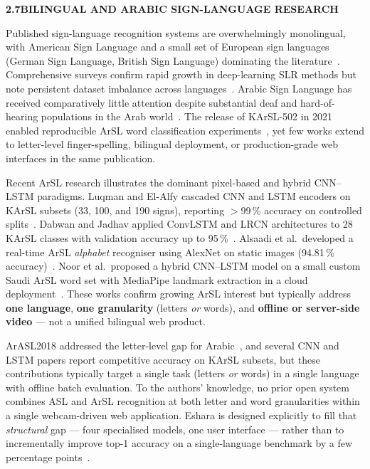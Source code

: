 \noindent\textbf{2.7\quad BILINGUAL AND ARABIC SIGN-LANGUAGE RESEARCH}\par
{}
\vspace{0.2cm}

\noindent Published sign-language recognition systems are overwhelmingly monolingual, with American Sign Language and a small set of European sign languages (German Sign Language, British Sign Language) dominating the literature~\cite{rastgoo2021survey,forster2014rwth,sterpu2018sign}. Comprehensive surveys confirm rapid growth in deep-learning SLR methods but note persistent dataset imbalance across languages~\cite{adaloglou2022comprehensive,al2022sign}. Arabic Sign Language has received comparatively little attention despite substantial deaf and hard-of-hearing populations in the Arab world~\cite{who2024hearing}. The release of KArSL-502 in 2021 enabled reproducible ArSL word classification experiments~\cite{sidig2021karsl}, yet few works extend to letter-level finger-spelling, bilingual deployment, or production-grade web interfaces in the same publication.\par\vspace{0.2cm}

\noindent Recent ArSL research illustrates the dominant pixel-based and hybrid CNN--LSTM paradigms. Luqman and El-Alfy cascaded CNN and LSTM encoders on KArSL subsets (33, 100, and 190 signs), reporting $>$99\,\% accuracy on controlled splits~\cite{luqman2022cascaded}. Dabwan and Jadhav applied ConvLSTM and LRCN architectures to 28 KArSL classes with validation accuracy up to 95\,\%~\cite{dabwan2023cnnlstm}. Alsaadi et al.\ developed a real-time ArSL \emph{alphabet} recogniser using AlexNet on static images (94.81\,\% accuracy)~\cite{alsaadi2022arsla}. Noor et al.\ proposed a hybrid CNN--LSTM model on a small custom Saudi ArSL word set with MediaPipe landmark extraction in a cloud deployment~\cite{noor2024hybrid}. These works confirm growing ArSL interest but typically address \textbf{one language}, \textbf{one granularity} (letters \emph{or} words), and \textbf{offline or server-side video} --- not a unified bilingual web product.\par\vspace{0.2cm}

\noindent ArASL2018 addressed the letter-level gap for Arabic~\cite{arthur2018arasl2018}, and several CNN and LSTM papers report competitive accuracy on KArSL subsets, but these contributions typically target a single task (letters \emph{or} words) in a single language with offline batch evaluation. To the authors' knowledge, no prior open system combines ASL and ArSL recognition at both letter and word granularities within a single webcam-driven web application. Eshara is designed explicitly to fill that \emph{structural} gap --- four specialised models, one user interface --- rather than to incrementally improve top-1 accuracy on a single-language benchmark by a few percentage points~\cite{li2020wlasl,sidig2021karsl}.\par\vspace{0.2cm}

